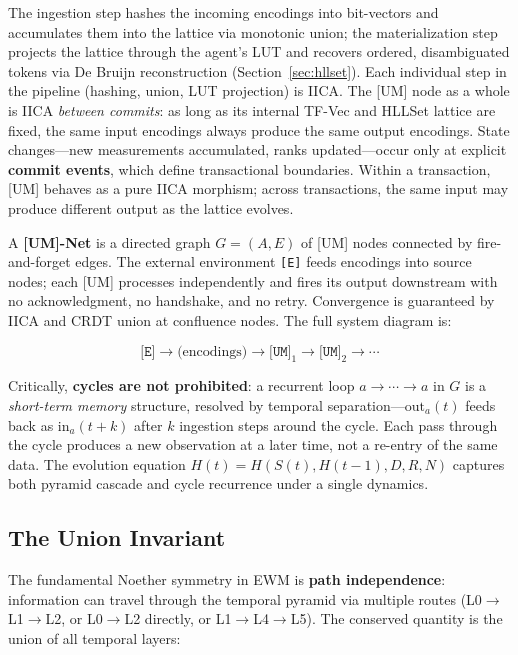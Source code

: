 \documentclass[11pt,a4paper]{article}
\theoremstyle{remark}
\begin{document}
The ingestion step hashes the incoming encodings into bit-vectors and accumulates them
into the lattice via monotonic union; the materialization step projects the lattice
through the agent's LUT and recovers ordered, disambiguated tokens via De Bruijn
reconstruction (Section~\ref{sec:hllset}).  Each individual step in the pipeline
(hashing, union, LUT projection) is IICA.  The [UM] node as a whole is IICA
\textit{between commits}: as long as its internal TF-Vec and HLLSet lattice are
fixed, the same input encodings always produce the same output encodings.  State
changes---new measurements accumulated, ranks updated---occur only at explicit
\textbf{commit events}, which define transactional boundaries.  Within a transaction,
[UM] behaves as a pure IICA morphism; across transactions, the same input may produce
different output as the lattice evolves.

A \textbf{[UM]-Net} is a directed graph $G = (A, E)$ of [UM] nodes connected by
fire-and-forget edges.  The external environment \texttt{[E]} feeds encodings into source
nodes; each [UM] processes independently and fires its output downstream with no
acknowledgment, no handshake, and no retry.  Convergence is guaranteed by IICA and CRDT
union at confluence nodes.  The full system diagram is:

\begin{equation}
  \texttt{[E]} \longrightarrow \text{(encodings)} \longrightarrow
  \texttt{[UM]}_1 \longrightarrow \texttt{[UM]}_2 \longrightarrow \cdots
\end{equation}

Critically, \textbf{cycles are not prohibited}: a recurrent loop
$a \to \cdots \to a$ in $G$ is a \textit{short-term memory} structure, resolved by
temporal separation---$\text{out}_a(t)$ feeds back as $\text{in}_a(t + k)$ after $k$
ingestion steps around the cycle.  Each pass through the cycle produces a new observation
at a later time, not a re-entry of the same data.  The evolution equation
$H(t) = H(S(t), H(t-1), D, R, N)$ captures both pyramid cascade and cycle recurrence
under a single dynamics.

\subsection{The Union Invariant}

The fundamental Noether symmetry in EWM is \textbf{path independence}: information can
travel through the temporal pyramid via multiple routes (L0$\to$L1$\to$L2, or
L0$\to$L2 directly, or L1$\to$L4$\to$L5). The conserved quantity is the union of all
temporal layers:
\end{document}
